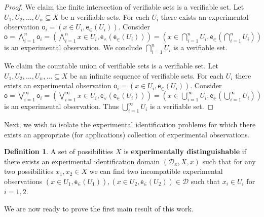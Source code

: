 \documentclass[review]{elsarticle}
\theoremstyle{plain}%
\theoremstyle{definition}
\newtheorem{defn}{Definition}[section]
\theoremstyle{remark}
\begin{document}
\begin{proof}
	We claim the finite intersection of verifiable sets is a verifiable set. Let $U_1, U_2, ... , U_n \subseteq X$ be n verifiable sets. For each $U_i$ there exists an experimental observation $\mathsf{o}_i = (x\in U_i, \mathsf{e}_\in(U_i))$. Consider $\mathsf{o} = \bigwedge\limits_{i=1}^{n} \mathsf{o}_i = (\bigwedge\limits_{i=1}^{n} x\in U_i , \mathsf{e}_{\wedge}(\mathsf{e}_\in(U_i)))=( x\in \bigcap\limits_{i=1}^{n} U_i, \mathsf{e}_\in(\bigcap\limits_{i=1}^{n} U_i))$ is an experimental observation. We conclude $\bigcap\limits_{i=1}^{n} U_i$ is a verifiable set.
	
	We claim the countable union of verifiable sets is a verifiable set. Let $U_1, U_2, ... , U_n, ... \subseteq X$ be an infinite sequence of verifiable sets. For each $U_i$ there exists an experimental observation $\mathsf{o}_i = (x\in U_i, \mathsf{e}_\in(U_i))$. Consider $\mathsf{o} = \bigvee\limits_{i=1}^{\infty} \mathsf{o}_i = (\bigvee\limits_{i=1}^{\infty} x\in U_i, \mathsf{e}_{\vee}(\mathsf{e}_\in(U_i)))=( x\in \bigcup\limits_{i=1}^{\infty} U_i, \mathsf{e}_\in(\bigcup\limits_{i=1}^{\infty} U_i))$ is an experimental observation. Thus $\bigcup\limits_{i=1}^{\infty} U_i$ is a verifiable set.
\end{proof}

Next, we wish to isolate the experimental identification problems for which there exists an appropriate (for applications) collection of experimental observations. 

\begin{defn}
A set of possibilities $X$ is \textbf{experimentally distinguishable} if there exists an experimental identification domain $(\mathcal{D}_x, X, x)$ such that for any two possibilities $x_1, x_2 \in X$ we can find two incompatible experimental observations $(x\in U_1, \mathsf{e}_\in(U_1)), (x\in U_2, \mathsf{e}_\in(U_2))\in\mathcal{D}$ such that $x_i\in U_i$ for $i=1,2$. 
\end{defn}

We are now ready to prove the first main result of this work.
\end{document}
